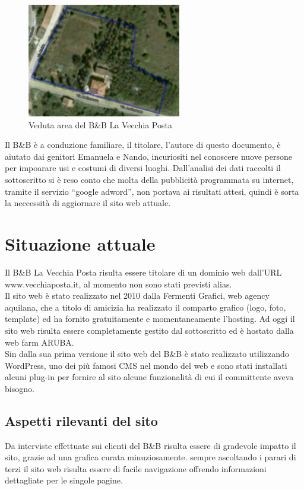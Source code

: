 \documentclass[a4paper,12pt,hidelinks]{report}
\begin{document}
\begin{figure}[h!]%
	\includegraphics[width=0.6\textwidth,keepaspectratio=true]{img/bbArea1}
	\centering
	\caption{Veduta area del B\&B La Vecchia Posta}%
	\label{fig:bbArea}%
\end{figure}
Il B\&B è a conduzione familiare, il titolare, l'autore di questo documento, è aiutato dai genitori Emanuela e Nando, incuriositi nel conoscere nuove persone per impoarare usi e costumi di diversi luoghi.
Dall'analisi dei dati raccolti il sottoscritto si è reso conto che molta della pubblicità programmata su internet, tramite il servizio ``google adword'', non portava ai risultati attesi,
quindi è sorta la neccessità di aggiornare il sito web attuale.

\section{Situazione attuale}
Il B\&B La Vecchia Posta risulta essere titolare di un dominio web dall'URL www.vecchiaposta.it, al momento non sono stati previsti alias. 
\\Il sito web è stato realizzato nel 2010 dalla Fermenti Grafici, web agency aquilana, che a titolo di amicizia ha realizzato
il comparto grafico (logo, foto, template) ed ha fornito gratuitamente e momentaneamente l'hosting.
Ad oggi il sito web risulta essere completamente gestito dal sottoscritto ed è hostato dalla web farm ARUBA.
\\Sin dalla sua prima versione il sito web del B\&B è stato realizzato utilizzando WordPress, uno dei più famosi CMS nel mondo del web e sono stati installati alcuni plug-in per fornire al sito alcune funzionalità di cui il committente aveva bisogno.

\subsection{Aspetti rilevanti del sito}
Da interviste effettuate sui clienti del B\&B risulta essere di gradevole impatto il sito, grazie ad una grafica curata minuziosamente.
sempre ascoltando i parari di terzi il sito web risulta essere di facile navigazione offrendo informazioni dettagliate per le singole pagine.
\end{document}

